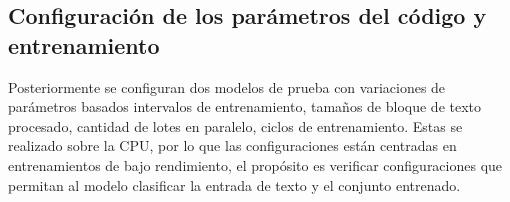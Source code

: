 \subsection{Configuración de los parámetros del código y entrenamiento}\label{section:Configuración y entrenamiento} 
Posteriormente se configuran dos modelos de prueba con variaciones de parámetros basados intervalos de entrenamiento, tamaños de bloque de texto procesado, cantidad de lotes en paralelo, ciclos de entrenamiento. 
Estas se realizado sobre la CPU, por lo que las configuraciones están centradas en entrenamientos de bajo rendimiento, el propósito es verificar configuraciones que permitan al modelo clasificar la entrada de texto y el conjunto entrenado.

